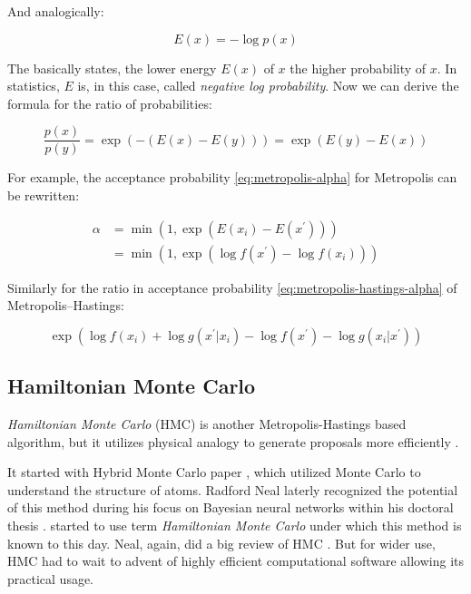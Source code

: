\documentclass[
  digital, %
  oneside, %
  lof,     %
  lot,     %
]{fithesis4}
\begin{document}
And analogically:

\begin{equation}
  E(x) = -\log p(x)
\end{equation}

The basically states, the lower energy $E(x)$ of $x$ the higher probability of $x$.
In statistics, $E$ is, in this case, called \textit{negative log probability}.
Now we can derive the formula for the ratio of probabilities:

\begin{equation}
  \frac{p(x)}{p(y)} = \exp \left( -(E(x) - E(y)) \right) = \exp \left( E(y) - E(x) \right)
\end{equation}

For example, the acceptance probability \eqref{eq:metropolis-alpha} for Metropolis can be rewritten:

\begin{equation}
  \begin{split}
    \alpha &= \min \left(
    1, 
    \exp\left( 
      E(x_{i}) - E(x^\prime)
    \right) 
  \right) \\
  & = \min \left(
    1, 
    \exp\left( 
      \log f(x^\prime) - \log f(x_{i})
    \right) 
  \right)
  \end{split}
\end{equation}

Similarly for the ratio in acceptance probability \eqref{eq:metropolis-hastings-alpha} of Metropolis–Hastings:

\begin{equation}
  \exp \left( \log f(x_{i}) + \log g(x^{\prime} | x_{i}) - \log f(x^\prime) - \log g(x_{i} | x^{\prime}) \right)
\end{equation}


\subsection{Hamiltonian Monte Carlo}

\textit{Hamiltonian Monte Carlo} (HMC) is another Metropolis-Hastings 
based algorithm, but it utilizes physical analogy to 
generate proposals more efficiently \cite{betancourt2018}.

It started with Hybrid Monte Carlo paper \cite{duane1987}, 
which utilized Monte Carlo to understand the structure 
of atoms. 
Radford Neal laterly recognized the potential of 
this method during his focus on Bayesian neural networks 
within his doctoral thesis \cite{neal1995}. 
\cite{mackay2003} started to use 
term \textit{Hamiltonian Monte Carlo} under which this 
method is known to this day.
Neal, again, did a big review of HMC \cite{neal2011}.
But for wider use, HMC had to 
wait to advent of highly efficient 
computational software allowing its practical usage.
\end{document}
